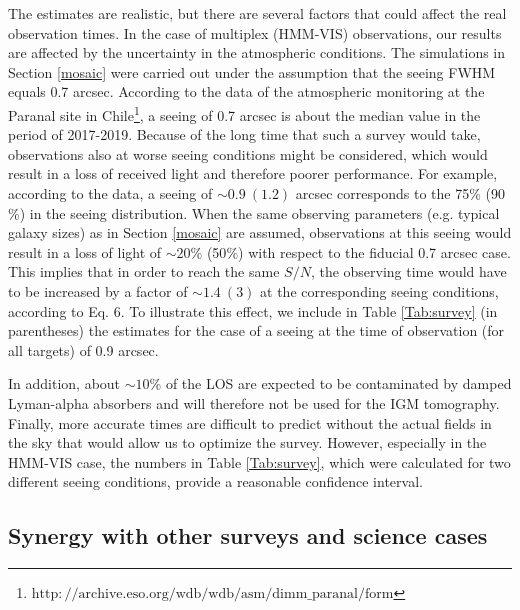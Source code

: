\documentclass{aa}
\begin{document}
The estimates are realistic, but there are several factors that could affect the real observation times. In the case of multiplex (HMM-VIS) observations, our results are affected by the uncertainty in the atmospheric conditions. The simulations in Section \ref{mosaic} were carried out under the assumption that the seeing FWHM equals 0.7 arcsec. According to the data of the atmospheric monitoring at the Paranal site in Chile\footnote{$\mathrm{http://archive.eso.org/wdb/wdb/asm/dimm\_paranal/form}$}, a seeing of 0.7 arcsec is about the median value in the period of 2017-2019. Because of the long time that such a survey would take, observations also at worse seeing conditions might be considered, which would result in a loss of received light and therefore poorer performance. For example, according to the data, a seeing of $\sim 0.9~(1.2)$ arcsec corresponds to the 75$\%$ (90$\%$) in the seeing distribution. When the same observing parameters (e.g. typical galaxy sizes) as in Section \ref{mosaic} are assumed, observations at this seeing would result in a loss of light of $\sim 20\%$ (50$\%$) with respect to the fiducial 0.7 arcsec case. This implies that in order to reach the same $S/N$, the observing time would have to be increased by a factor of $\sim1.4~(3)$ at the corresponding seeing conditions, according to Eq. 6. To illustrate this effect, we include in Table \ref{Tab:survey} (in parentheses) the estimates for the case of a seeing at the time of observation (for all targets) of 0.9 arcsec.

In addition, about $\sim 10\%$ of the LOS are expected to be contaminated by damped Lyman-alpha absorbers \citep{Wolfe2005} and will therefore not be used for the IGM tomography. Finally, more accurate times are difficult to predict without the actual fields in the sky that would allow us to optimize the survey. However, especially in the HMM-VIS case, the numbers in Table \ref{Tab:survey}, which were calculated for two different seeing conditions, provide a  reasonable confidence interval.

\subsection{Synergy with other surveys and science cases}
\label{synergy}
\end{document}
